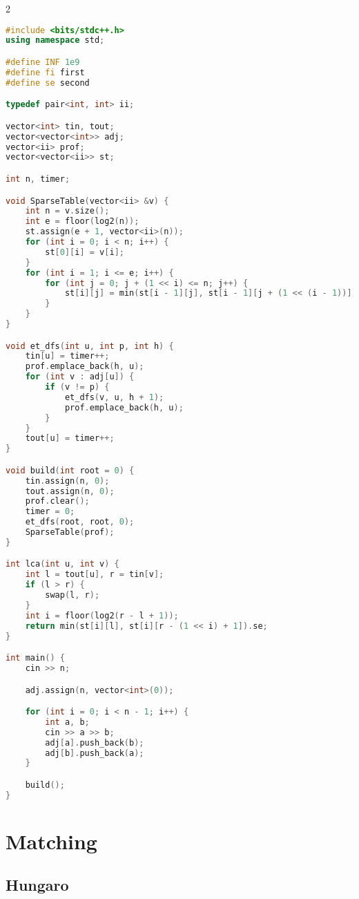 \documentclass[11pt, a4paper, oneside]{book}
\begin{document}
\begin{multicols}{2}
\begin{lstlisting}[language=C++]
#include <bits/stdc++.h>
using namespace std;

#define INF 1e9
#define fi first
#define se second

typedef pair<int, int> ii;

vector<int> tin, tout;
vector<vector<int>> adj;
vector<ii> prof;
vector<vector<ii>> st;

int n, timer;

void SparseTable(vector<ii> &v) {
    int n = v.size();
    int e = floor(log2(n));
    st.assign(e + 1, vector<ii>(n));
    for (int i = 0; i < n; i++) {
        st[0][i] = v[i];
    }
    for (int i = 1; i <= e; i++) {
        for (int j = 0; j + (1 << i) <= n; j++) {
            st[i][j] = min(st[i - 1][j], st[i - 1][j + (1 << (i - 1))]);
        }
    }
}

void et_dfs(int u, int p, int h) {
    tin[u] = timer++;
    prof.emplace_back(h, u);
    for (int v : adj[u]) {
        if (v != p) {
            et_dfs(v, u, h + 1);
            prof.emplace_back(h, u);
        }
    }
    tout[u] = timer++;
}

void build(int root = 0) {
    tin.assign(n, 0);
    tout.assign(n, 0);
    prof.clear();
    timer = 0;
    et_dfs(root, root, 0);
    SparseTable(prof);
}

int lca(int u, int v) {
    int l = tout[u], r = tin[v];
    if (l > r) {
        swap(l, r);
    }
    int i = floor(log2(r - l + 1));
    return min(st[i][l], st[i][r - (1 << i) + 1]).se;
}

int main() {
    cin >> n;

    adj.assign(n, vector<int>(0));

    for (int i = 0; i < n - 1; i++) {
        int a, b;
        cin >> a >> b;
        adj[a].push_back(b);
        adj[b].push_back(a);
    }

    build();
}
\end{lstlisting}
\end{multicols}

\hfill

\section{Matching}
\subsection{Hungaro}
\end{document}

